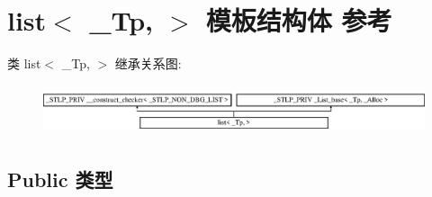 \hypertarget{classlist}{}\section{list$<$ \+\_\+\+Tp, $>$ 模板结构体 参考}
\label{classlist}
类 list$<$ \+\_\+\+Tp, $>$ 继承关系图\+:\begin{figure}[H]
\begin{center}
\leavevmode
\includegraphics[height=1.485411cm]{classlist}
\end{center}
\end{figure}
\subsection*{Public 类型}
